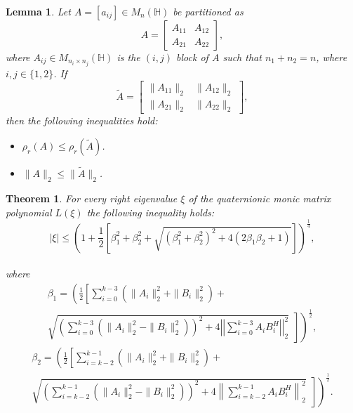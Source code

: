 \documentclass[10pt,a4paper]{amsart}
\newtheorem{lemma}{Lemma}
\newtheorem{theorem}{Theorem}
\begin{document}
    \begin{lemma}{\label{lemma 3.2}}
    Let \( A = [a_{ij}] \in M_n(\mathbb{H}) \) be partitioned as
    \[
    A = \begin{bmatrix}
        A_{11} & A_{12} \\
        A_{21} & A_{22}
    \end{bmatrix},
    \]
    where \( A_{ij} \in M_{n_i \times n_j}(\mathbb{H}) \) is the \((i,j)\) block of \( A \) such that \( n_1 + n_2 = n \), where \( i,j \in \{1,2\} \). If
    \[
    \tilde{A} = \begin{bmatrix}
        \|A_{11}\|_2 & \|A_{12}\|_2 \\
        \|A_{21}\|_2 & \|A_{22}\|_2
    \end{bmatrix},
    \]
    then the following inequalities hold:
    \begin{itemize}
        \item \( \rho_r(A) \leq \rho_r(\tilde{A}) \).
        \item \( \|A\|_2 \leq \|\tilde{A}\|_2 \).
    \end{itemize}
\end{lemma}

\begin{theorem}{\label{theorem 3.6}}
     For every right eigenvalue $\xi$ of the quaternionic monic matrix polynomial $L(\xi)$ the following inequality holds:\\
    \begin{equation*}
|\xi| \le \left( 1+\frac{1}{2} \left[ \beta^{2}_{1} + \beta^{2}_{2} +\sqrt{(\beta^{2}_{1}+\beta^{2}_{2})^{2}+4\left(2\beta_{1}\beta_{2} + 1 \right) }\right] \right)^{\frac{1}{4}},
\end{equation*}\\
where \begin{multline*}
 \beta_{1}=\left( \frac{1}{2} \left[ \sum_{i=0}^{k-3}\left(\|A_{i}\|^{2}_{2}+\|B_{i}\|_{2}^{2}\right)+ \right. \right. \\
\left. \left.\sqrt{ \left( \sum_{i=0}^{k-3}\left(\|A_{i}\|^{2}_{2}-\|B_{i}\|_{2}^{2} \right)     \right)^{2}            +4\left|\left|\sum_{i=0}^{k-3}A_{i}{B_{i}^{H}}\right|\right|_{2}^{2} }~~\right]  \right)^{\frac{1}{2}},
\end{multline*}
\begin{multline*} 
\beta_{2}=\left( \frac{1}{2} \left[ \sum_{i=k-2}^{k-1}\left(\|A_{i}\|^{2}_{2}+\|B_{i}\|_{2}^{2}\right)+ \right. \right. \\
\left. \left. \sqrt{ \left( \sum_{i=k-2}^{k-1}\left(\|A_{i}\|^{2}_{2}-\|B_{i}\|_{2}^{2} \right) \right)^{2} +4\left\|\sum_{i=k-2}^{k-1}A_{i}{B_{i}^{H}}\right\|_{2}^{2} }~~\right] \right)^{\frac{1}{2}}. 
\end{multline*}


\end{theorem}
\end{document}
